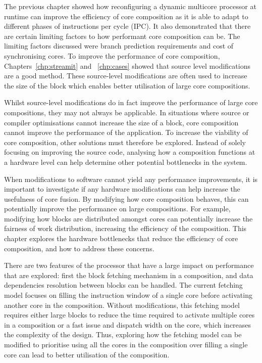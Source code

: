 The previous chapter showed how reconfiguring a dynamic multicore processor at runtime can improve the efficiency of core composition as it is able to adapt to different phases of instructions per cycle (IPC).
It also demonstrated that there are certain limiting factors to how performant core composition can be.
The limiting factors discussed were branch prediction requirements and cost of synchronising cores.
To improve the performance of core composition, Chapters~\ref{chp:streamit} and ~\ref{chp:cases} showed that source level modifications are a good method.
These source-level modifications are often used to increase the size of the block which enables better utilisation of large core compositions.

Whilst source-level modifications do in fact improve the performance of large core compositions, they may not always be applicable.
In situations where source or compiler optimisations cannot increase the size of a block, core composition cannot improve the performance of the application.
To increase the viability of core composition, other solutions must therefore be explored.
Instead of solely focusing on improving the source code, analysing how a composition functions at a hardware level can help determine other potential bottlenecks in the system.

When modifications to software cannot yield any performance improvements, it is important to investigate if any hardware modifications can help increase the usefulness of core fusion.
By modifying how core composition behaves, this can potentially improve the performance on large compositions.
For example, modifying how blocks are distributed amongst cores can potentially increase the fairness of work distribution, increasing the efficiency of the composition.
This chapter explores the hardware bottlenecks that reduce the efficiency of core composition, and how to address these concerns.

There are two features of the processor that have a large impact on performance that are explored: first the block fetching mechanism in a composition, and data dependencies resolution between blocks can be handled.
The current fetching model focuses on filling the instruction window of a single core before activating another core in the composition.
Without modifications, this fetching model requires either large blocks to reduce the time required to activate multiple cores in a composition or a fast issue and dispatch width on the core, which increases the complexity of the design.
Thus, exploring how the fetching model can be modified to prioritise using all the cores in the composition over filling a single core can lead to better utilisation of the composition.

